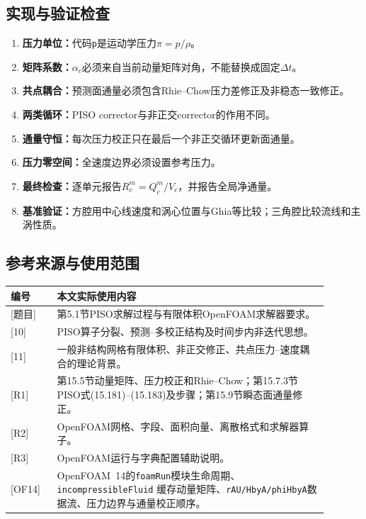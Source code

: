 \documentclass[UTF8,12pt,a4paper]{ctexart}
\numberwithin{equation}{section}
\newcommand{\dt}{\Delta t}
\newcommand{\Task}{\textnormal{[题目]}}
\newcommand{\Issa}{\textnormal{[10]}}
\newcommand{\Jasak}{\textnormal{[11]}}
\newcommand{\Rone}{\textnormal{[R1]}}
\newcommand{\Rtwo}{\textnormal{[R2]}}
\newcommand{\Rthree}{\textnormal{[R3]}}
\newcommand{\OFfourteen}{\textnormal{[OF14]}}
\begin{document}
\subsection{实现与验证检查}
\begin{enumerate}
  \item \textbf{压力单位：}代码\texttt{p}是运动学压力$\pi=p/\rho$。
  \item \textbf{矩阵系数：}$\alpha_c$必须来自当前动量矩阵对角，不能替换成固定$\dt$。
  \item \textbf{共点耦合：}预测面通量必须包含Rhie--Chow压力差修正及非稳态一致修正。
  \item \textbf{两类循环：}PISO corrector与非正交corrector的作用不同。
  \item \textbf{通量守恒：}每次压力校正只在最后一个非正交循环更新面通量。
  \item \textbf{压力零空间：}全速度边界必须设置参考压力。
  \item \textbf{最终检查：}逐单元报告$R_c^m=Q_c^m/V_c$，并报告全局净通量。
  \item \textbf{基准验证：}方腔用中心线速度和涡心位置与Ghia等比较；三角腔比较流线和主涡性质。
\end{enumerate}

\subsection{参考来源与使用范围}
\begin{longtable}{p{0.13\linewidth}p{0.76\linewidth}}
\toprule
编号 & 本文实际使用内容\\
\midrule
\Task & 第5.1节PISO求解过程与有限体积OpenFOAM求解器要求。\\
\Issa & PISO算子分裂、预测--多校正结构及时间步内非迭代思想。\\
\Jasak & 一般非结构网格有限体积、非正交修正、共点压力--速度耦合的理论背景。\\
\Rone & 第15.5节动量矩阵、压力校正和Rhie--Chow；第15.7.3节PISO式(15.181)--(15.183)及步骤；第15.9节瞬态面通量修正。\\
\Rtwo & OpenFOAM网格、字段、面积向量、离散格式和求解器算子。\\
\Rthree & OpenFOAM运行与字典配置辅助说明。\\
\OFfourteen & OpenFOAM~14的\texttt{foamRun}模块生命周期、\texttt{incompressibleFluid}
缓存动量矩阵、\texttt{rAU/HbyA/phiHbyA}数据流、压力边界与通量校正顺序。\\
\bottomrule
\end{longtable}
\end{document}
